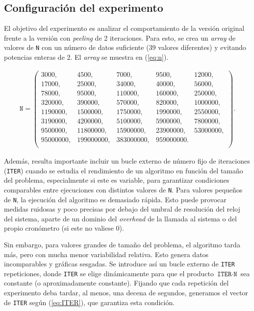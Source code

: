 \documentclass[11pt,a4paper,twoside]{article}
\theoremstyle{definition}
\begin{document}
	\subsection{Configuración del experimento}
	
	El objetivo del experimento es analizar el comportamiento de la versión original frente a la versión con \textit{peeling} de 2 iteraciones. Para esto, se crea un \textit{array} de valores de \texttt{N} con un número de datos suficiente (39 valores diferentes) y evitando potencias enteras de 2. El \textit{array} se muestra en (\ref{eq:n}).
	
	\begin{equation}\label{eq:n}
		\begin{aligned}
			\texttt{N} = \left(
			\begin{matrix}
				3000,      & 4500,      & 7000,      & 9500,      & 12000,		\\
				17000,     & 25000,     & 34000,     & 40000,     & 56000,		\\
				78000,     & 95000,     & 110000,    & 160000,    & 250000,		\\
				320000,    & 390000,    & 570000,    & 820000,    & 1000000,	\\
				1190000,   & 1500000,   & 1750000,   & 1990000,   & 2550000,	\\ 
				3190000,   & 4200000,   & 5100000,   & 5900000,   & 7800000,	\\
				9500000,   & 11800000,  & 15900000,  & 23900000,  & 53000000,	\\
				95000000,  & 199000000, & 383000000, & 959000000. &	\\
			\end{matrix}
			\right).
		\end{aligned}
	\end{equation}

	Además, resulta importante incluir un bucle externo de número fijo de iteraciones (\texttt{ITER}) cuando se estudia el rendimiento de un algoritmo en función del tamaño del problema, especialmente si este es variable, para garantizar condiciones comparables entre ejecuciones con distintos valores de \texttt{N}. Para valores pequeños de \texttt{N}, la ejecución del algoritmo es demasiado rápida. Esto puede provocar medidas ruidosas y poco precisas por debajo del umbral de resolución del reloj del sistema, aparte de un dominio del \textit{overhead} de la llamada al sistema o del propio cronómetro (si este no valiese 0).
	
	Sin embargo, para valores grandes de tamaño del problema, el algoritmo tarda más, pero con mucha menor variabilidad relativa. Esto genera datos incomparables y gráficas sesgadas. Se introduce así un bucle externo de \texttt{ITER} repeticiones, donde \texttt{ITER} se elige dinámicamente para que el producto $\texttt{ITER} \cdot \texttt{N}$ sea constante (o aproximadamente constante). Fijando que cada repetición del experimento deba tardar, al menos, una decena de segundos, generamos el vector de \texttt{ITER} según (\ref{eq:ITER}), que garantiza esta condición.
	
\end{document}
